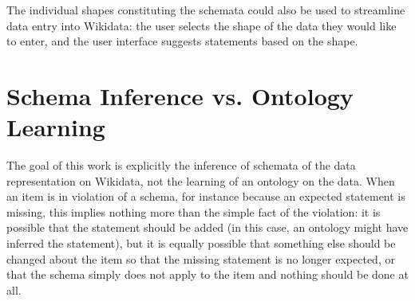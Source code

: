 \documentclass{scrartcl}
\begin{document}
The individual shapes constituting the schemata could also be used to streamline data entry into Wikidata:
the user selects the shape of the data they would like to enter,
and the user interface suggests statements based on the shape.

\section{Schema Inference vs. Ontology Learning}

The goal of this work is explicitly the inference of schemata of the data representation on Wikidata,
not the learning of an ontology on the data.
When an item is in violation of a schema,
for instance because an expected statement is missing,
this implies nothing more than the simple fact of the violation:
it is possible that the statement should be added
(in this case, an ontology might have inferred the statement),
but it is equally possible that something else should be changed about the item so that the missing statement is no longer expected,
or that the schema simply does not apply to the item and nothing should be done at all.



\end{document}
